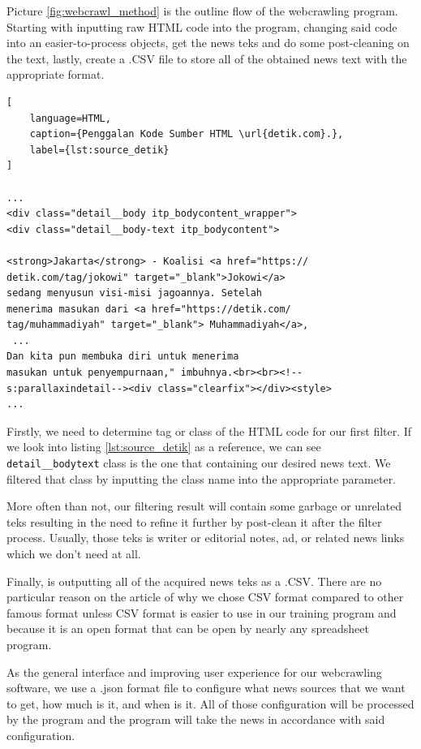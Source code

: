 Picture \ref{fig:webcrawl_method} is the outline flow of the webcrawling program. Starting with inputting raw HTML code into the program, changing said code into an easier-to-process objects, get the news teks and do some post-cleaning on the text, lastly, create a .CSV file to store all of the obtained news text with the appropriate format.

\begin{lstlisting}[
    language=HTML, 
    caption={Penggalan Kode Sumber HTML \url{detik.com}.},
    label={lst:source_detik}
]

...
<div class="detail__body itp_bodycontent_wrapper">
<div class="detail__body-text itp_bodycontent">

<strong>Jakarta</strong> - Koalisi <a href="https://
detik.com/tag/jokowi" target="_blank">Jokowi</a> 
sedang menyusun visi-misi jagoannya. Setelah 
menerima masukan dari <a href="https://detik.com/
tag/muhammadiyah" target="_blank"> Muhammadiyah</a>,
 ... 
Dan kita pun membuka diri untuk menerima 
masukan untuk penyempurnaan," imbuhnya.<br><br><!--
s:parallaxindetail--><div class="clearfix"></div><style>
...

\end{lstlisting}

Firstly, we need to determine tag or class of the HTML code for our first filter. If we look into listing \ref{lst:source_detik} as a reference, we can see \texttt{detail\_\_body\-text} class is the one that containing our desired news text. We filtered that class by inputting the class name into the appropriate parameter.

More often than not, our filtering result will contain some garbage or unrelated teks resulting in the need to refine it further by post-clean it after the filter process. Usually, those teks is writer or editorial notes, ad, or related news links which we don't need at all.

Finally, is outputting all of the acquired news teks as a .CSV. There are no particular reason on the article of why we chose CSV format compared to other famous format unless CSV format is easier to use in our training program and because it is an open format that can be open by nearly any spreadsheet program.

As the general interface and improving user experience for our webcrawling software, we use a .json format file to configure what news sources that we want to get, how much is it, and when is it. All of those configuration will be processed by the program and the program will take the news in accordance with said configuration.


